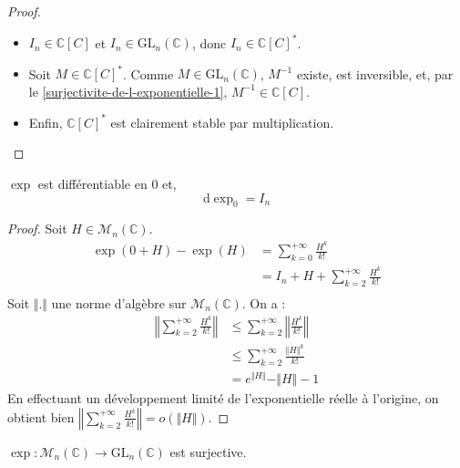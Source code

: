   \begin{proof}
    \begin{itemize}
      \item $I_n \in \mathbb{C}[C]$ et $I_n \in \mathrm{GL}_n(\mathbb{C})$, donc $I_n \in \mathbb{C}[C]^*$.
      \item Soit $M \in \mathbb{C}[C]^*$. Comme $M \in \mathrm{GL}_n(\mathbb{C})$, $M^{-1}$ existe, est inversible, et, par le \cref{surjectivite-de-l-exponentielle-1}, $M^{-1} \in \mathbb{C}[C]$.
      \item Enfin, $\mathbb{C}[C]^*$ est clairement stable par multiplication.
    \end{itemize}
  \end{proof}

  \begin{lemma}
    \label{surjectivite-de-l-exponentielle-4}
    $\exp$ est différentiable en $0$ et,
    \[ \mathrm{d}\exp_0 = I_n \]
  \end{lemma}

  \begin{proof}
    Soit $H \in \mathcal{M}_n(\mathbb{C})$.
    \begin{align*}
      \exp(0+H) - \exp(H) &= \sum_{k=0}^{+\infty} \frac{H^k}{k!} \\
      &= I_n + H + \sum_{k=2}^{+\infty} \frac{H^k}{k!} \\
    \end{align*}
    Soit $\Vert . \Vert$ une norme d'algèbre sur $\mathcal{M}_n(\mathbb{C})$. On a :
    \begin{align*}
      \left\Vert \sum_{k=2}^{+\infty} \frac{H^k}{k!} \right\Vert &\leq \sum_{k=2}^{+\infty} \left\Vert \frac{H^k}{k!} \right\Vert \\
      &\leq \sum_{k=2}^{+\infty} \frac{\Vert H \Vert^k}{k!} \\
      &= e^{\Vert H \Vert} - \Vert H \Vert - 1
    \end{align*}
    En effectuant un développement limité de l'exponentielle réelle à l'origine, on obtient bien $\left\Vert \sum_{k=2}^{+\infty} \frac{H^k}{k!} \right\Vert = o(\Vert H \Vert)$.
  \end{proof}

  \begin{theorem}
    \label{surjectivite-de-l-exponentielle-5}
    $\exp : \mathcal{M}_n(\mathbb{C}) \rightarrow \mathrm{GL}_n(\mathbb{C})$ est surjective.
  \end{theorem}

